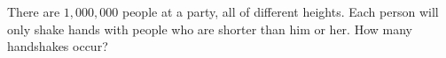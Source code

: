 There are $1{,}000{,}000$ people at a party, all of different heights. Each person will only shake hands with people who are shorter than him or her. How many handshakes occur?
